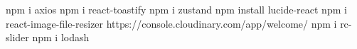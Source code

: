 npm i axios 
npm i react-toastify
npm i zustand
npm install lucide-react
npm i react-image-file-resizer
https://console.cloudinary.com/app/welcome/
npm i rc-slider
npm i lodash
